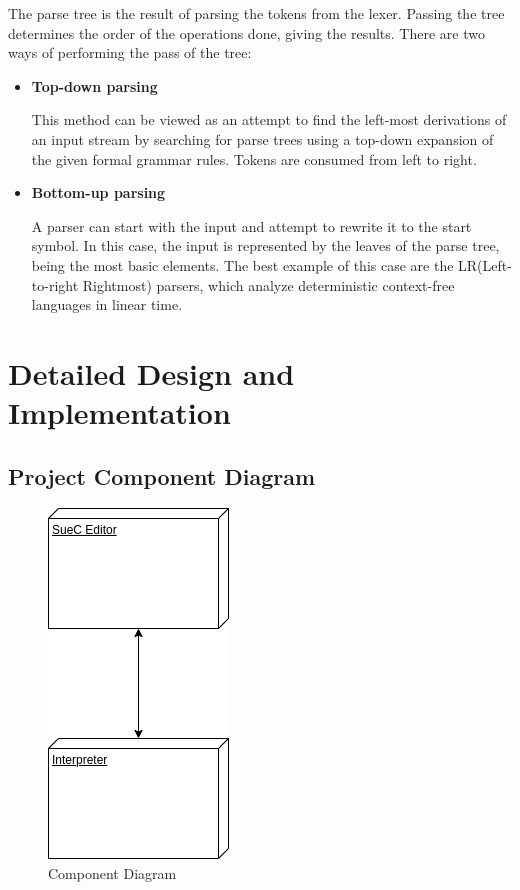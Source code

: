 \documentclass[12pt,a4paper,twoside]{report}
\begin{document}
 	The parse tree is the result of parsing the tokens from the lexer. Passing the tree determines the order of the operations done, giving the results. There are two ways of performing the pass of the tree:
 	
 	\begin{itemize}
 		\item \textbf{Top-down parsing}
 		
 		This method can be viewed as an attempt to find the left-most derivations of an input stream by searching for parse trees using a top-down expansion of the given formal grammar rules. Tokens are consumed from left to right.
 		
 		\item \textbf{Bottom-up parsing}
 		
 		A parser can start with the input and attempt to rewrite it to the start symbol. In this case, the input is represented by the leaves of the parse tree, being the most basic elements. The best example of this case are the LR(Left-to-right Rightmost) parsers, which analyze deterministic context-free languages in linear time.
 	\end{itemize}

\chapter{Detailed Design and Implementation}

\section{Project Component Diagram}
\begin{figure}[h]
 \centering
 \includegraphics[scale=0.6]{img/diags/CompDiag.png}
 \caption{Component Diagram}
\end{figure}
\end{document}
